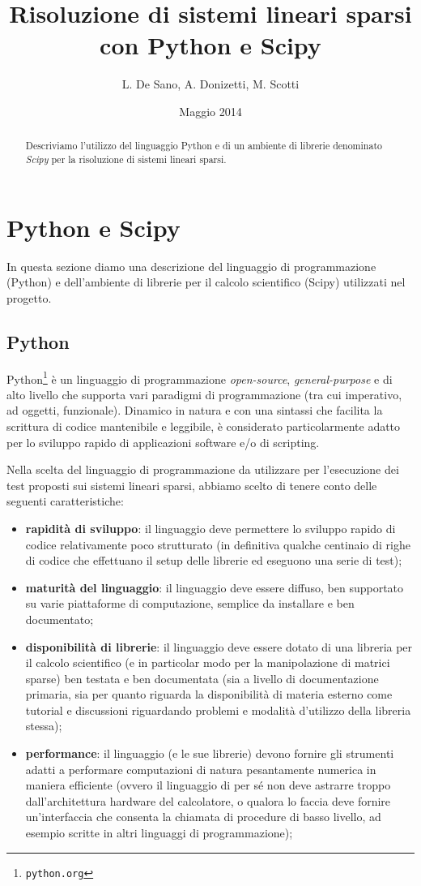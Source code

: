 \documentclass[11pt,a4paper]{scrartcl}
\author{L. De Sano, A. Donizetti, M. Scotti}
\title{Risoluzione di sistemi lineari sparsi \\con Python e Scipy}
\date{Maggio 2014}
\begin{document}
\maketitle
\begin{abstract}
Descriviamo l'utilizzo del linguaggio Python e di un ambiente di librerie denominato \emph{Scipy} per la risoluzione di sistemi lineari sparsi.
\end{abstract}

\section*{Python e Scipy}

In questa sezione diamo una descrizione del linguaggio di programmazione (Python) e dell'ambiente di librerie per il calcolo scientifico (Scipy) utilizzati nel progetto.

\subsection*{Python}

Python\footnote{\texttt{python.org}} è un linguaggio di programmazione \emph{open-source}, \emph{general-purpose} e di alto livello che supporta vari paradigmi di programmazione (tra cui imperativo, ad oggetti, funzionale). Dinamico in natura e con una sintassi che facilita la scrittura di codice mantenibile e leggibile, è considerato particolarmente adatto per lo sviluppo rapido di applicazioni software e/o di scripting.

Nella scelta del linguaggio di programmazione da utilizzare per l'esecuzione dei test proposti sui sistemi lineari sparsi, abbiamo scelto di tenere conto delle seguenti caratteristiche:
\begin{itemize}
	\item \textbf{rapidità di sviluppo}: il linguaggio deve permettere lo sviluppo rapido di codice relativamente poco strutturato 		(in definitiva qualche centinaio di righe di codice che effettuano il setup delle librerie ed eseguono una serie di test);
	\item \textbf{maturità del linguaggio}: il linguaggio deve essere diffuso, ben supportato su varie piattaforme di computazione, 	semplice da installare e ben documentato;
	\item \textbf{disponibilità di librerie}: il linguaggio deve essere dotato di una libreria per il calcolo scientifico (e in particolar modo per la manipolazione di matrici sparse) ben testata e ben documentata (sia a livello di documentazione primaria, sia per quanto riguarda la disponibilità di materia esterno come tutorial e discussioni riguardando problemi e modalità d'utilizzo della libreria stessa);
	\item \textbf{performance}: il linguaggio (e le sue librerie) devono fornire gli strumenti adatti a performare computazioni di 		natura pesantamente numerica in maniera efficiente (ovvero il linguaggio di per sé non deve astrarre troppo dall'architettura    	hardware del calcolatore, o qualora lo faccia deve fornire un'interfaccia che consenta la chiamata di procedure di basso 				livello, ad esempio scritte in altri linguaggi di programmazione);
\end{itemize}
\end{document}
